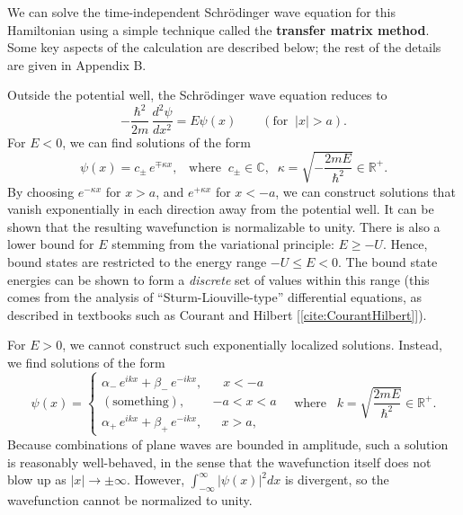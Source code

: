 \documentclass[pra,12pt]{revtex4}
\begin{document}
We can solve the time-independent Schr\"odinger wave equation for this
Hamiltonian using a simple technique called the \textbf{transfer
  matrix method}.  Some key aspects of the calculation are described
below; the rest of the details are given in Appendix B.

Outside the potential well, the Schr\"odinger wave equation reduces to
\begin{equation}
  -\frac{\hbar^2}{2m}\,\frac{d^2\psi}{dx^2} = E \psi(x)
  \qquad (\text{for}\;\;|x| > a).  
  \label{eq:psioutside}
\end{equation}
For $E < 0$, we can find solutions of the form
\begin{equation}
  \psi(x) = c_\pm\, e^{\mp\kappa x},\;\;\;\mathrm{where}\;\;
  c_\pm \in \mathbb{C}, \;\;
  \kappa = \sqrt{-\frac{2mE}{\hbar^2}} \in \mathbb{R}^+.
\end{equation}
By choosing $e^{-\kappa x}$ for $x > a$, and $e^{+\kappa x}$ for $x <
-a$, we can construct solutions that vanish exponentially in each
direction away from the potential well.  It can be shown that the
resulting wavefunction is normalizable to unity.  There is also a
lower bound for $E$ stemming from the variational principle: $E \ge
-U$.  Hence, bound states are restricted to the energy range $-U \le E
< 0$.  The bound state energies can be shown to form a
\textit{discrete} set of values within this range (this comes from the
analysis of ``Sturm-Liouville-type'' differential equations, as
described in textbooks such as Courant and Hilbert
[\ref{cite:CourantHilbert}]).

For $E > 0$, we cannot construct such exponentially localized
solutions.  Instead, we find solutions of the form
\begin{equation}
  \psi(x) = \begin{cases} \alpha_-\, e^{ik x} + \beta_-\, e^{-ik x}, & \;\;\;x < -a\\ (\mathrm{something}) , & -a < x < a\\ \alpha_+\, e^{ik x} + \beta_+\, e^{-ik x} , & \;\;\,x > a,\end{cases}
  \quad\mathrm{where}\;\;\;
  k = \sqrt{\frac{2mE}{\hbar^2}} \in \mathbb{R}^+.
  \label{psiwaves}
\end{equation}
Because combinations of plane waves are bounded in amplitude, such a
solution is reasonably well-behaved, in the sense that the
wavefunction itself does not blow up as $|x| \rightarrow \pm\infty$.
However, $\int_{-\infty}^\infty |\psi(x)|^2 dx$ is divergent, so the
wavefunction cannot be normalized to unity.
\end{document}
